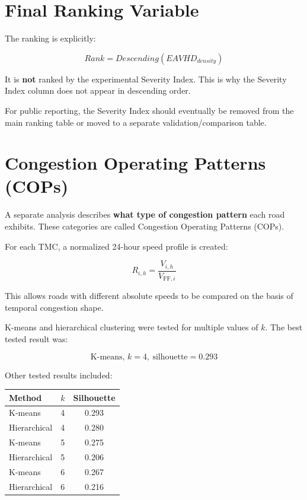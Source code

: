\documentclass[11pt]{article}
\begin{document}
\section{Final Ranking Variable}

The ranking is explicitly:

\[
\boxed{Rank = Descending(EAVHD_{density})}
\]

It is \textbf{not} ranked by the experimental Severity Index. This is why the Severity Index column does not appear in descending order.

For public reporting, the Severity Index should eventually be removed from the main ranking table or moved to a separate validation/comparison table.

\section{Congestion Operating Patterns (COPs)}

A separate analysis describes \textbf{what type of congestion pattern} each road exhibits. These categories are called Congestion Operating Patterns (COPs).

For each TMC, a normalized 24-hour speed profile is created:

\[
\boxed{
R_{i,h} = \frac{V_{i,h}}{V_{\mathrm{FF},i}}
}
\]

This allows roads with different absolute speeds to be compared on the basis of temporal congestion shape.

K-means and hierarchical clustering were tested for multiple values of $k$. The best tested result was:

\[
\boxed{\text{K-means, }k=4,\ \text{silhouette}=0.293}
\]

Other tested results included:

\begin{center}
\begin{tabular}{lcc}
\toprule
Method & $k$ & Silhouette \\
\midrule
K-means & 4 & 0.293 \\
Hierarchical & 4 & 0.280 \\
K-means & 5 & 0.275 \\
Hierarchical & 5 & 0.206 \\
K-means & 6 & 0.267 \\
Hierarchical & 6 & 0.216 \\
\bottomrule
\end{tabular}
\end{center}
\end{document}
